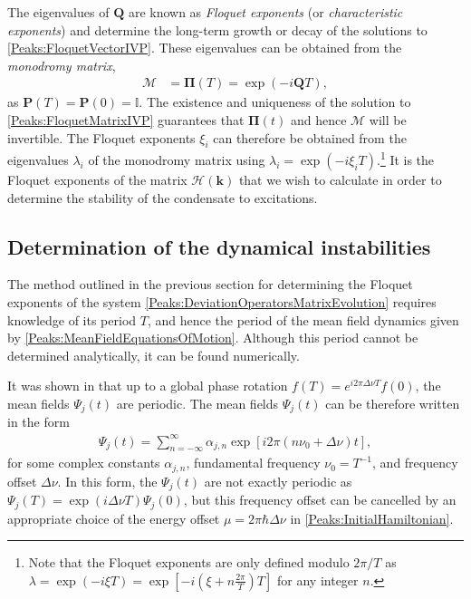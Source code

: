 The eigenvalues of $\bm{Q}$ are known as \emph{Floquet exponents} (or \emph{characteristic exponents}) and determine the long-term growth or decay of the solutions to \eqref{Peaks:FloquetVectorIVP}. These eigenvalues can be obtained from the \emph{monodromy matrix},
\begin{align}
    \label{Peaks:MonodromyMatrix}
    \mathcal{M} &= \bm{\Pi}(T) = \exp(-i\bm{Q} T),
\end{align}
as $\bm{P}(T) = \bm{P}(0) = \mathbb{I}$. The existence and uniqueness of the solution to \eqref{Peaks:FloquetMatrixIVP} guarantees that $\bm{\Pi}(t)$ and hence $\mathcal{M}$ will be invertible. The Floquet exponents $\xi_i$ can therefore be obtained from the eigenvalues $\lambda_i$ of the monodromy matrix using $\lambda_i = \exp(-i\xi_i T)$.\footnote{Note that the Floquet exponents are only defined modulo $2 \pi/T$ as $\displaystyle\lambda = \exp(-i\xi T) = \exp\left[-i \left(\xi + n \frac{2 \pi}{T}\right)T\right]$ for any integer $n$.} It is the Floquet exponents of the matrix $\mathcal{H}(\bm{k})$ that we wish to calculate in order to determine the stability of the condensate to excitations.

\subsection{Determination of the dynamical instabilities}
\label{Peaks:ExperimentEigenvalues}

The method outlined in the previous section for determining the Floquet exponents of the system \eqref{Peaks:DeviationOperatorsMatrixEvolution} requires knowledge of its period $T$, and hence the period of the mean field dynamics given by \eqref{Peaks:MeanFieldEquationsOfMotion}. Although this period cannot be determined analytically, it can be found numerically.

It was shown in  that up to a global phase rotation $\displaystyle f(T) = e^{i 2\pi \Delta \nu T}f(0)$, the mean fields $\Psi_j(t)$ are periodic. The mean fields $\Psi_j(t)$ can be therefore written in the form
\begin{align}
    \label{Peaks:MeanFieldFourierDecomposition}
    \Psi_j(t) = \sum_{n=-\infty}^\infty \alpha_{j,n} \exp\left[i 2\pi \left( n \nu_0 + \Delta\nu\right)t \right],
\end{align}
for some complex constants $\alpha_{j, n}$, fundamental frequency $\nu_0 = T^{-1}$, and frequency offset $\Delta \nu$. In this form, the $\Psi_j(t)$ are not exactly periodic as $\Psi_j(T) = \exp(i\Delta \nu T)\Psi_j(0)$, but this frequency offset can be cancelled by an appropriate choice of the energy offset $\mu = 2\pi\hbar \Delta \nu$ in \eqref{Peaks:InitialHamiltonian}.

